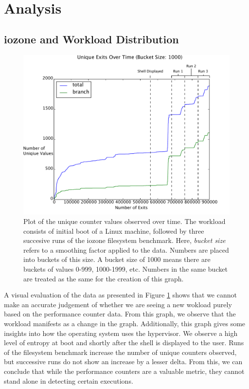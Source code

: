 \documentclass[notitlepage]{article}
\begin{document}
\section{Analysis}
\label{sec:analysis}

\subsection{iozone and Workload Distribution}
\begin{figure}[htp]
    \centering
    \includegraphics[width=4.5in]{iozone_plot.pdf}
    \caption{Plot of the unique counter values observed over time. The workload
    consists of initial boot of a Linux machine, followed by three succesive
runs of the iozone filesystem benchmark. Here, \textit{bucket size} refers to
a smoothing factor applied to the data. Numbers are placed into buckets of this
size. A bucket size of 1000 means there are buckets of values 0-999, 1000-1999,
etc. Numbers in the same bucket are treated as the same for the creation of this
graph.}
    \label{fig:iozoneplot}
\end{figure}

A visual evaluation of the data as presented in Figure \ref{fig:iozoneplot}
shows that we cannot make an accurate judgement of whether we are seeing a new
wokload purely based on the performance counter data. From this graph, we
observe that the workload manifests as a change in the graph. Additionally, this
graph gives some insights into how the operating system uses the hypervisor. We
observe a high level of entropy at boot and shortly after the shell is displayed
to the user. Runs of the filesystem benchmark increase the number of unique
counters observed, but successive runs do not show an increase by a lesser
delta. From this, we can conclude that while the performance counters are a
valuable metric, they cannot stand alone in detecting certain executions.
\end{document}
